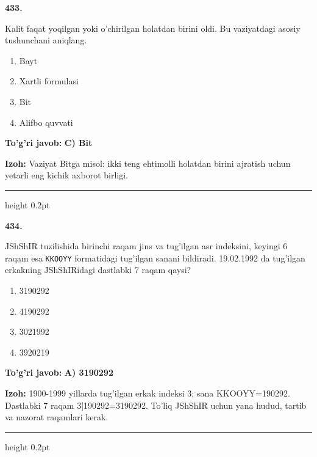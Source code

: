 \documentclass[10pt,a4paper,oneside]{article}
\begin{document}
\noindent\textbf{\color{ink}433.}
\par
Kalit faqat yoqilgan yoki o'chirilgan holatdan birini oldi. Bu vaziyatdagi asosiy tushunchani aniqlang.
\begin{enumerate}[label=\Alph*),leftmargin=9mm]
\item Bayt
\item Xartli formulasi
\item Bit
\item Alifbo quvvati
\end{enumerate}
\begin{tcolorbox}[enhanced,breakable,colback=teal!4,colframe=teal!50!black,boxrule=0.5pt,arc=1.1mm,left=3mm,right=3mm,top=1.7mm,bottom=1.7mm,before skip=2mm,after skip=2mm]
\textbf{\color{teal}To'g'ri javob:} \textbf{C) Bit}
\par\smallskip
\textbf{Izoh:} Vaziyat Bitga misol: ikki teng ehtimolli holatdan birini ajratish uchun yetarli eng kichik axborot birligi.
\end{tcolorbox}
\vspace{2mm}\hrule height 0.2pt \vspace{3mm}

\noindent\textbf{\color{ink}434.}
\par
JShShIR tuzilishida birinchi raqam jins va tug'ilgan asr indeksini, keyingi 6 raqam esa \texttt{KKOOYY} formatidagi tug'ilgan sanani bildiradi. 19.02.1992 da tug'ilgan erkakning JShShIRidagi dastlabki 7 raqam qaysi?
\begin{enumerate}[label=\Alph*),leftmargin=9mm]
\item 3190292
\item 4190292
\item 3021992
\item 3920219
\end{enumerate}
\begin{tcolorbox}[enhanced,breakable,colback=teal!4,colframe=teal!50!black,boxrule=0.5pt,arc=1.1mm,left=3mm,right=3mm,top=1.7mm,bottom=1.7mm,before skip=2mm,after skip=2mm]
\textbf{\color{teal}To'g'ri javob:} \textbf{A) 3190292}
\par\smallskip
\textbf{Izoh:} 1900-1999 yillarda tug'ilgan erkak indeksi 3; sana KKOOYY=190292. Dastlabki 7 raqam 3|190292=3190292. To'liq JShShIR uchun yana hudud, tartib va nazorat raqamlari kerak.
\end{tcolorbox}
\vspace{2mm}\hrule height 0.2pt \vspace{3mm}
\end{document}
